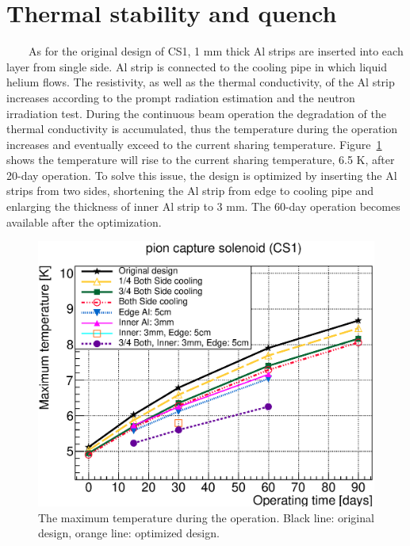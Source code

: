 \documentclass[a4paper, 10pt, twocolumn]{article}
\begin{document}
\section{Thermal stability and quench}
~~~~As for the original design of CS1, 1 mm thick Al strips are inserted into each layer from single side.
Al strip is connected to the cooling pipe in which liquid helium flows.
The resistivity, as well as the thermal conductivity, of the Al strip increases according to the prompt radiation estimation and the neutron irradiation test.
During the continuous beam operation the degradation of the thermal conductivity is accumulated, thus the temperature during the operation increases and eventually exceed to the current sharing temperature.
Figure~\ref{temp} shows the temperature will rise to the current sharing temperature, 6.5 K, after 20-day operation.
To solve this issue, the design is optimized by inserting the Al strips from two sides, shortening the Al strip from edge to cooling pipe and enlarging the thickness of inner Al strip to 3 mm.
The 60-day operation becomes available after the optimization.
\begin{figure}[H]
 \centering
 \includegraphics[scale=0.4]{fig/maxtemp.eps}
 \caption{The maximum temperature during the operation. Black line: original design, orange line: optimized design.}
 \label{temp}
\end{figure}
\end{document}
